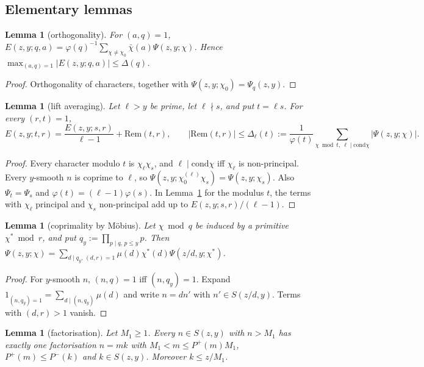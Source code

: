 \documentclass[11pt]{amsart}
\newtheorem{lemma}[theorem]{Lemma}
\theoremstyle{definition}
\newcommand{\Pp}{P^{+}}
\begin{document}
\subsection{Elementary lemmas}

\begin{lemma}[orthogonality]\label{lem:E1}
For $(a,q)=1$, $E(z,y;q,a)=\varphi(q)^{-1}\sum_{\chi\ne\chi_0}\bar\chi(a)\Psi(z,y;\chi)$. Hence $\max_{(a,q)=1}|E(z,y;q,a)|\le\Delta(q)$.
\end{lemma}

\begin{proof}
Orthogonality of characters, together with $\Psi(z,y;\chi_0)=\Psi_q(z,y)$.
\end{proof}

\begin{lemma}[lift averaging]\label{lem:E2}
Let $\ell>y$ be prime, let $\ell\nmid s$, and put $t=\ell s$. For every $(r,t)=1$,
\[
E(z,y;t,r)=\frac{E(z,y;s,r)}{\ell-1}+\mathrm{Rem}(t,r),\qquad|\mathrm{Rem}(t,r)|\le\Delta_\ell(t):=\frac1{\varphi(t)}\sum_{\chi\bmod t,\ \ell\mid\mathrm{cond}\chi}|\Psi(z,y;\chi)|.
\]
\end{lemma}

\begin{proof}
Every character modulo $t$ is $\chi_\ell\chi_s$, and $\ell\mid\mathrm{cond}\chi$ iff $\chi_\ell$ is non-principal. Every $y$-smooth $n$ is
coprime to $\ell$, so $\Psi(z,y;\chi_0^{(\ell)}\chi_s)=\Psi(z,y;\chi_s)$. Also $\Psi_t=\Psi_s$ and $\varphi(t)=(\ell-1)\varphi(s)$. In
Lemma~\ref{lem:E1} for the modulus $t$, the terms with $\chi_\ell$ principal and $\chi_s$ non-principal add up to $E(z,y;s,r)/(\ell-1)$.
\end{proof}

\begin{lemma}[coprimality by M\"obius]\label{lem:E3}
Let $\chi\bmod q$ be induced by a primitive $\chi^*\bmod r$, and put $q_y:=\prod_{p\mid q,\,p\le y}p$. Then
$\Psi(z,y;\chi)=\sum_{d\mid q_y,\,(d,r)=1}\mu(d)\chi^*(d)\Psi(z/d,y;\chi^*)$.
\end{lemma}

\begin{proof}
For $y$-smooth $n$, $(n,q)=1$ iff $(n,q_y)=1$. Expand $1_{(n,q_y)=1}=\sum_{d\mid(n,q_y)}\mu(d)$ and write $n=dn'$ with $n'\in S(z/d,y)$. Terms with
$(d,r)>1$ vanish.
\end{proof}

\begin{lemma}[factorisation]\label{lem:E4}
Let $M_1\ge1$. Every $n\in S(z,y)$ with $n>M_1$ has exactly one factorisation $n=mk$ with $M_1<m\le\Pp(m)M_1$, $\Pp(m)\le P^-(k)$
and $k\in S(z,y)$. Moreover $k\le z/M_1$.
\end{lemma}
\end{document}
